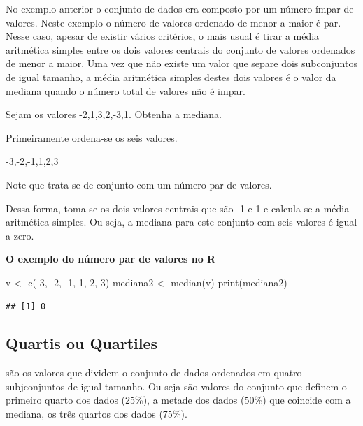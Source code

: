 \documentclass[
]{book}
\newenvironment{Shaded}{\begin{snugshade}}{\end{snugshade}}
\newcommand{\DecValTok}[1]{\textcolor[rgb]{0.00,0.00,0.81}{#1}}
\newcommand{\FunctionTok}[1]{\textcolor[rgb]{0.00,0.00,0.00}{#1}}
\newcommand{\NormalTok}[1]{#1}
\newcommand{\OtherTok}[1]{\textcolor[rgb]{0.56,0.35,0.01}{#1}}
\newcommand{\SpecialCharTok}[1]{\textcolor[rgb]{0.00,0.00,0.00}{#1}}
\begin{document}
No exemplo anterior o conjunto de dados era composto por um número ímpar de valores. Neste exemplo o número de valores ordenado de menor a maior é par. Nesse caso, apesar de existir vários critérios, o mais usual é tirar a média aritmética simples entre os dois valores centrais do conjunto de valores ordenados de menor a maior. Uma vez que não existe um valor que separe dois subconjuntos de igual tamanho, a média aritmética simples destes dois valores é o valor da mediana quando o número total de valores não é impar.

Sejam os valores -2,1,3,2,-3,1. Obtenha a mediana.

Primeiramente ordena-se os seis valores.

-3,-2,-1,1,2,3

Note que trata-se de conjunto com um número par de valores.

Dessa forma, toma-se os dois valores centrais que são -1 e 1 e calcula-se a média aritmética simples. Ou seja, a mediana para este conjunto com seis valores é igual a zero.

\textbf{O exemplo do número par de valores no R}

\begin{Shaded}
\begin{Highlighting}[]
\NormalTok{v }\OtherTok{\textless{}{-}} \FunctionTok{c}\NormalTok{(}\SpecialCharTok{{-}}\DecValTok{3}\NormalTok{, }\SpecialCharTok{{-}}\DecValTok{2}\NormalTok{, }\SpecialCharTok{{-}}\DecValTok{1}\NormalTok{, }\DecValTok{1}\NormalTok{, }\DecValTok{2}\NormalTok{, }\DecValTok{3}\NormalTok{)}
\NormalTok{mediana2 }\OtherTok{\textless{}{-}} \FunctionTok{median}\NormalTok{(v)}
\FunctionTok{print}\NormalTok{(mediana2)}
\end{Highlighting}
\end{Shaded}

\begin{verbatim}
## [1] 0
\end{verbatim}

\hypertarget{quartis-ou-quartiles}{%
\subsection{Quartis ou Quartiles}\label{quartis-ou-quartiles}}

são os valores que dividem o conjunto de dados ordenados em quatro subjconjuntos
de igual tamanho. Ou seja são valores do conjunto que definem o primeiro quarto
dos dados (25\%), a metade dos dados (50\%) que coincide com a mediana, os três
quartos dos dados (75\%).
\end{document}
